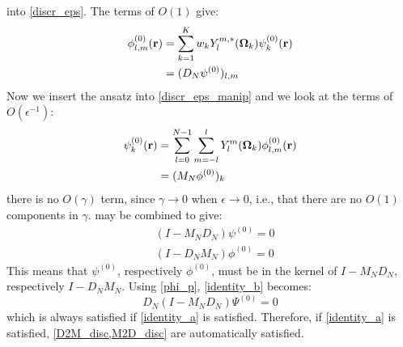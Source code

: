 into \cref{discr_eps}. The terms of $O(1)$ give:
\begin{equation}
\begin{split}
\phi_{l,m}^{(0)}(\br) &= \sum_{k=1}^K w_k Y_l^{m,*}(\bo_k) \psi_k^{(0)}(\br)\\ 
&= (D_N\psi^{(0)})_{l,m}
\end{split}
\label{D2M_disc}
\end{equation}
Now we insert the ansatz into \cref{discr_eps_manip} and we look at the terms
of $O(\epsilon^{-1})$:
\begin{equation}
\begin{split}
\psi_k^{(0)}(\br) &=\sum_{l=0}^{N-1} \sum_{m=-l}^l Y_l^m(\bo_k) 
\phi_{l,m}^{(0)}(\br)\\
&= (M_N\phi^{(0)})_k
\end{split}
\label{M2D_disc}
\end{equation}
there is no $O(\gamma)$ term, since $\gamma\rightarrow 0$ when 
$\epsilon\rightarrow 0$, i.e., that there are no
$O(1)$ components in $\gamma$.  may be combined to give:
\begin{align}
&(I-M_ND_N)\psi^{(0)} = 0 \label{identity_a}\\
&(I-D_NM_N)\phi^{(0)} = 0 \label{identity_b}
\end{align}
This means that $\psi^{(0)}$, respectively $\phi^{(0)}$, must be in the kernel
of $I-M_N D_N$, respectively $I-D_N M_N$. Using \cref{phi_p},
\cref{identity_b} becomes:
\begin{equation}
D_N(I-M_N D_N)\Psi^{(0)} = 0
\end{equation}
which is always satisfied if \cref{identity_a} is satisfied.
Therefore, if \cref{identity_a} is satisfied, \cref{D2M_disc,M2D_disc} are
automatically satisfied.

